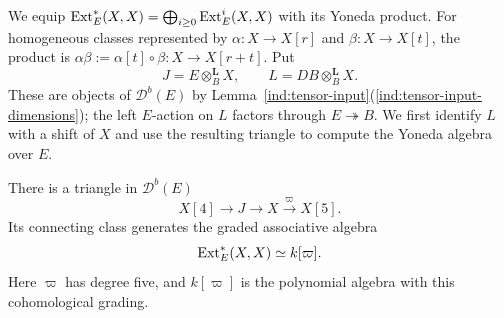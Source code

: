 \documentclass[11pt]{article}
\begin{document}
We equip ${\rm Ext}_E^*(X,X)=\bigoplus_{i\ge0}{\rm Ext}_E^i(X,X)$ with its
Yoneda product. For homogeneous classes represented by
$\alpha:X\to X[r]$ and $\beta:X\to X[t]$, the product is
$\alpha\beta:=\alpha[t]\circ\beta:X\to X[r+t]$.
Put
$$J=E\otimes_B^{\mathbf L}X,\qquad L=DB\otimes_B^{\mathbf L}X.$$
These are objects of $\mathscr D^b(E)$ by
Lemma~\ref{ind:tensor-input}\textup{(\ref{ind:tensor-input-dimensions})}; the left $E$-action on $L$ factors through
$E\twoheadrightarrow B$.
We first identify $L$ with a shift of $X$ and use the resulting
triangle to compute the Yoneda algebra over $E$.

\begin{Prop}\label{ind:one-generator}
There is a triangle in $\mathscr D^b(E)$
\begin{equation*}
 X[4]\longrightarrow J\longrightarrow X
   \xrightarrow{\varpi}X[5].
\end{equation*}
Its connecting class generates the graded associative algebra
\begin{equation*}
 {\rm Ext}_E^*(X,X)\simeq k[\varpi].
\end{equation*}
Here $\varpi$ has degree five, and $k[\varpi]$ is the polynomial algebra
with this cohomological grading.
\end{Prop}
\end{document}
